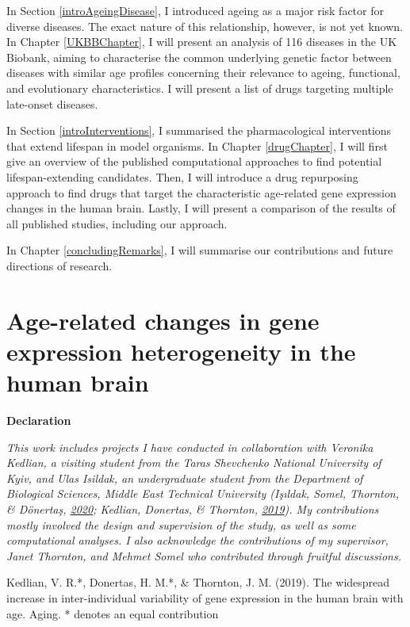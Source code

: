 \documentclass[12pt,twoside]{unicam}
\begin{document}
In Section \ref{introAgeingDisease}, I introduced ageing as a major risk factor for diverse diseases. The exact nature of this relationship, however, is not yet known. In Chapter \ref{UKBBChapter}, I will present an analysis of 116 diseases in the UK Biobank, aiming to characterise the common underlying genetic factor between diseases with similar age profiles concerning their relevance to ageing, functional, and evolutionary characteristics. I will present a list of drugs targeting multiple late-onset diseases.

In Section \ref{introInterventions}, I summarised the pharmacological interventions that extend lifespan in model organisms. In Chapter \ref{drugChapter}, I will first give an overview of the published computational approaches to find potential lifespan-extending candidates. Then, I will introduce a drug repurposing approach to find drugs that target the characteristic age-related gene expression changes in the human brain. Lastly, I will present a comparison of the results of all published studies, including our approach.

In Chapter \ref{concludingRemarks}, I will summarise our contributions and future directions of research.

\hypertarget{HeterogeneityChapter}{%
\chapter{Age-related changes in gene expression heterogeneity in the human brain}\label{HeterogeneityChapter}}

\small

\textbf{Declaration}

\emph{This work includes projects I have conducted in collaboration with Veronika Kedlian, a visiting student from the Taras Shevchenko National University of Kyiv, and Ulas Isildak, an undergraduate student from the Department of Biological Sciences, Middle East Technical University (Işıldak, Somel, Thornton, \& Dönertaş, \protect\hyperlink{ref-Isildak2020}{2020}; Kedlian, Donertas, \& Thornton, \protect\hyperlink{ref-Kedlian2019}{2019}). My contributions mostly involved the design and supervision of the study, as well as some computational analyses. I also acknowledge the contributions of my supervisor, Janet Thornton, and Mehmet Somel who contributed through fruitful discussions.}

Kedlian, V. R.*, Donertas, H. M.*, \& Thornton, J. M. (2019). The widespread increase in inter-individual variability of gene expression in the human brain with age. Aging.
* denotes an equal contribution
\end{document}
